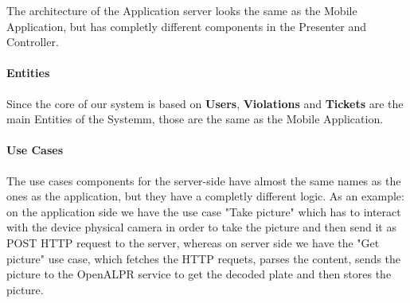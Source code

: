The architecture of the Application server looks the same as the Mobile Application, but has completly different components in the Presenter and Controller.

\paragraph{Entities}
 Since the core of our system is based on \textbf{Users}, \textbf{Violations} and \textbf{Tickets} are the main Entities of the Systemm, those are the same as the Mobile Application.


\paragraph{Use Cases}
The use cases components for the server-side have almost the same names as the ones as the application, but they have a completly different logic.
As an example: on the application side we have the use case "Take picture" which has to interact with the device physical camera in order to take the picture and then send it as POST HTTP request to the server, whereas on server side we have the "Get picture" use case, which fetches the HTTP requets, parses the content, sends the picture to the OpenALPR service to get the decoded plate and then stores the picture.
